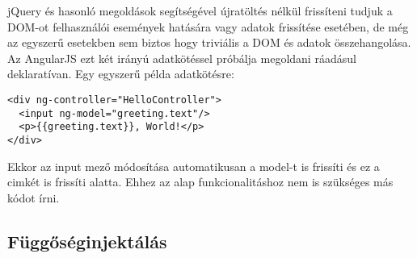 jQuery és hasonló megoldások segítségével újratöltés nélkül frissíteni tudjuk a DOM-ot felhasználói események hatására vagy adatok frissítése esetében, de még az egyszerű esetekben sem biztos hogy triviális a DOM és adatok összehangolása. Az AngularJS ezt két irányú adatkötéssel próbálja megoldani ráadásul deklaratívan. Egy egyszerű példa adatkötésre:

\lstset{language=HTML}
\begin{lstlisting}[frame=single]  
<div ng-controller="HelloController">
  <input ng-model="greeting.text"/>
  <p>{{greeting.text}}, World!</p>
</div>
\end{lstlisting}
Ekkor az input mező módosítása automatikusan a model-t is frissíti és ez a cimkét is frissíti alatta. Ehhez az alap funkcionalitáshoz nem is szükséges más kódot írni.


\subsection{Függőséginjektálás}


